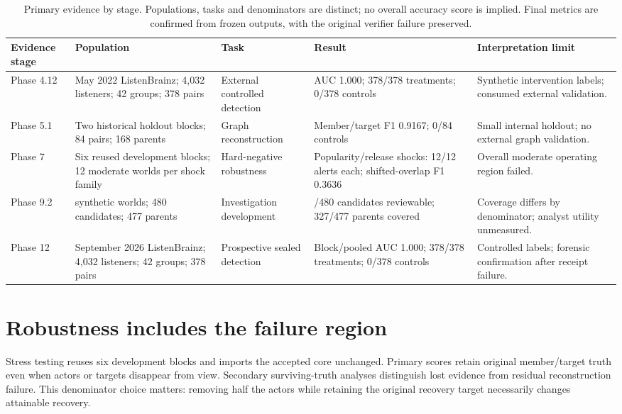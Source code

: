 \documentclass[11pt,letterpaper]{article}
\begin{document}
\begin{table}[tbp]\centering\small
\caption{Primary evidence by stage. Populations, tasks and denominators are distinct; no overall accuracy score is implied. Final metrics are confirmed from frozen outputs, with the original verifier failure preserved.}
\renewcommand{\arraystretch}{1.18}\begin{tabularx}{\linewidth}{@{}>{\raggedright\arraybackslash}p{.10\linewidth}>{\raggedright\arraybackslash}p{.23\linewidth}>{\raggedright\arraybackslash}p{.16\linewidth}>{\raggedright\arraybackslash}p{.21\linewidth}>{\raggedright\arraybackslash}X@{}}\toprule
Evidence stage & Population & Task & Result & Interpretation limit\\\midrule
Phase 4.12 & May 2022 ListenBrainz; 4,032 listeners; 42 groups; 378 pairs & External controlled detection & AUC 1.000; 378/378 treatments; 0/378 controls & Synthetic intervention labels; consumed external validation.\\
Phase 5.1 & Two historical holdout blocks; 84 pairs; 168 parents & Graph reconstruction & Member/target F1 0.9167; 0/84 controls & Small internal holdout; no external graph validation.\\
Phase 7 & Six reused development blocks; 12 moderate worlds per shock family & Hard-negative robustness & Popularity/release shocks: 12/12 alerts each; shifted-overlap F1 0.3636 & Overall moderate operating region failed.\\
Phase 9.2 & 321 synthetic worlds; 480 candidates; 477 parents & Investigation development & 416/480 candidates reviewable; 327/477 parents covered & Coverage differs by denominator; analyst utility unmeasured.\\
Phase 12 & September 2026 ListenBrainz; 4,032 listeners; 42 groups; 378 pairs & Prospective sealed detection & Block/pooled AUC 1.000; 378/378 treatments; 0/378 controls & Controlled labels; forensic confirmation after receipt failure.\\
\bottomrule\end{tabularx}\label{tab:results}
\end{table}

\section{Robustness includes the failure region}
Stress testing reuses six development blocks and imports the accepted core unchanged. Primary scores retain original member/target truth even when actors or targets disappear from view. Secondary surviving-truth analyses distinguish lost evidence from residual reconstruction failure. This denominator choice matters: removing half the actors while retaining the original recovery target necessarily changes attainable recovery.
\end{document}

